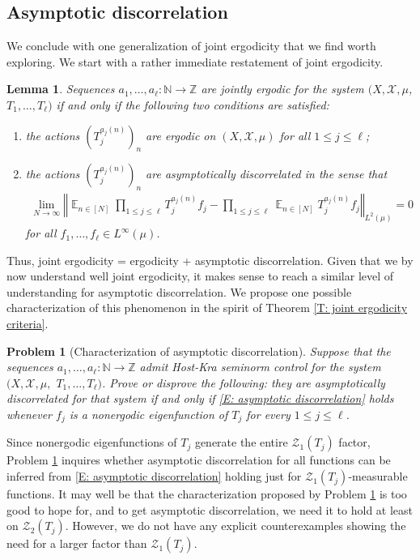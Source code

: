 \documentclass[11pt]{amsart}
\newtheorem{lemma}{Lemma}[section]
\newtheorem{problem}{Problem}
\theoremstyle{definition}
\DeclareMathOperator*{\E}{\mathbb{E}}
\newcommand{\N}{{\mathbb N}}
\newcommand{\Z}{{\mathbb Z}}
\newcommand{\CX}{{\mathcal X}}
\newcommand{\CZ}{{\mathcal Z}}
\newcommand{\norm}[1]{\left\Vert #1\right\Vert}
\newcommand{\1}{{\mathbf{1}}}
\begin{document}
\subsection{Asymptotic discorrelation}
We conclude with one generalization of joint ergodicity that we find worth exploring. We start with a rather immediate restatement of joint ergodicity.
\begin{lemma}
    Sequences $a_1, \ldots, a_\ell:\N\to\Z$ are jointly ergodic for the system $(X, \CX, \mu$, $T_1, \ldots, T_\ell)$ if and only if the following two conditions are satisfied:
    \begin{enumerate}
        \item the actions $(T_j^{a_j(n)})_n$ are ergodic on $(X, \CX, \mu)$ for all $1\leq j\leq \ell$;
        \item the actions $(T_j^{a_j(n)})_n$ are \emph{asymptotically discorrelated} in the sense that
        \begin{align}\label{E: asymptotic discorrelation}
            \lim_{N\to\infty}\norm{\E_{n\in[N]}\prod_{1\leq j\leq \ell}T_j^{a_j(n)}f_j - \prod_{1\leq j\leq \ell}\E_{n\in[N]}T_j^{a_j(n)}f_j}_{L^2(\mu)}=0
        \end{align}
        for all $f_1, \ldots, f_\ell\in L^\infty(\mu)$. 
    \end{enumerate}
\end{lemma}
Thus, joint ergodicity = ergodicity + asymptotic discorrelation. Given that we by now understand well joint ergodicity, it makes sense to reach a similar level of understanding for asymptotic discorrelation. We propose one possible characterization of this phenomenon in the spirit of Theorem \ref{T: joint ergodicity criteria}.
\begin{problem}[Characterization of asymptotic discorrelation]\label{Pr: discorrelation}
    Suppose that the sequences $a_1, \ldots, a_\ell:\N\to\Z$ admit Host-Kra seminorm control for the system $(X, \CX, \mu,$\! $T_1, \ldots, T_\ell)$. Prove or disprove the following: they are asymptotically discorrelated for that system if and only if \eqref{E: asymptotic discorrelation} holds whenever $f_j$ is a nonergodic eigenfunction of $T_j$ for every $1\leq j\leq \ell$.
\end{problem}
Since nonergodic eigenfunctions of $T_j$ generate the entire $\CZ_1(T_j)$ factor, Problem \ref{Pr: discorrelation} inquires whether asymptotic discorrelation for all functions can be inferred from \eqref{E: asymptotic discorrelation} holding just for $\CZ_1(T_j)$-measurable functions. It may well be that the characterization proposed by Problem \ref{Pr: discorrelation} is too good to hope for, and to get asymptotic discorrelation, we need it to hold at least on $\CZ_2(T_j)$. However, we do not have any explicit counterexamples showing the need for a larger factor than $\CZ_1(T_j)$. 
\end{document}
